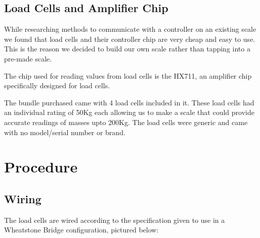 \documentclass[10pt]{article}
\begin{document}
{\begin{flushleft}
{{\large\subsection{Load Cells and Amplifier Chip}\par}
While researching methods to communicate with a controller on an existing scale we found that load cells and their controller chip are very cheap and easy to use. This is the reason we decided to build our own scale rather than tapping into a pre-made scale.

The chip used for reading values from load cells is the HX711, an amplifier chip specifically designed for load cells.

The bundle purchased came with 4 load cells included in it. These load cells had an individual rating of 50Kg each allowing us to make a scale that could provide accurate readings of masses upto 200Kg. The load cells were generic and came with no model/serial number or brand.


\par}
{\newpage\Large\section{Procedure}\par}
{\large
{\large\subsection{Wiring}\par}
The load cells are wired according to the specification given to use in a Wheatstone Bridge configuration, pictured below:

}
\end{flushleft}}
\end{document}
